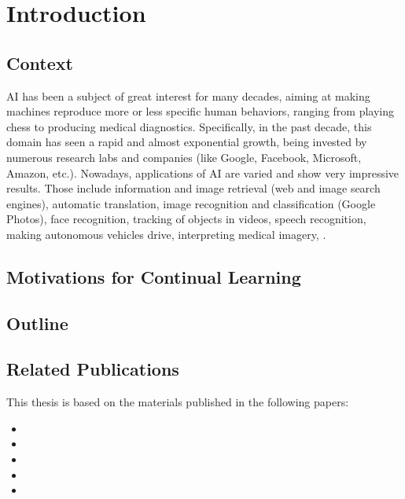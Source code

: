\chapter{Introduction}
\label{chapter:introduction}

{}


\section{Context}

\acf{AI} has been a subject of great interest for many decades, aiming at making machines reproduce more or less specific human behaviors, ranging from playing chess to producing medical diagnostics. Specifically, in the past decade, this domain has seen a rapid and almost exponential growth, being invested by numerous research labs and companies (like Google, Facebook, Microsoft, Amazon, etc.). Nowadays, applications of \ac{AI} are varied and show very impressive results. Those include information and image retrieval (web and image search engines), automatic translation, image recognition and classification (\eg Google Photos), face recognition, tracking of objects in videos, speech recognition, making autonomous vehicles drive, interpreting medical imagery, \etc.

\section{Motivations for Continual Learning}

\section{Outline}

\section{Related Publications}

This thesis is based on the materials published in the following papers:

\begin{itemize}
    \item {}
    \item {}
    \item {}
    \item {}
    \item {}
\end{itemize}
